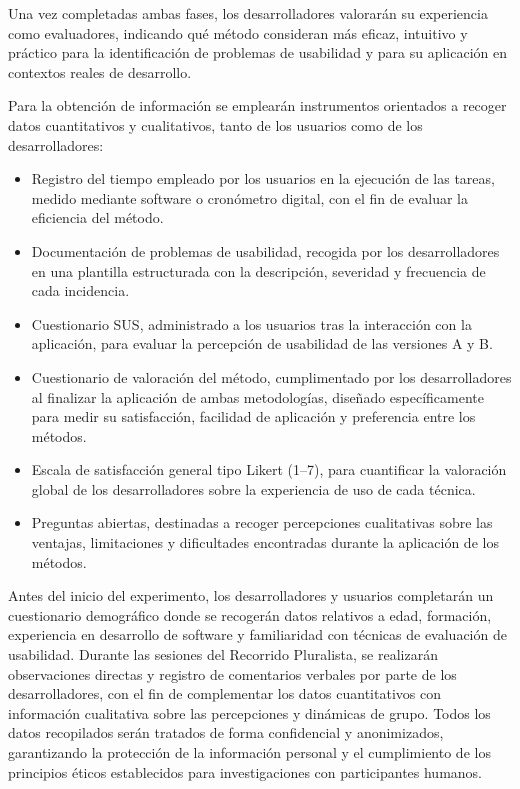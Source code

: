 \documentclass[a4paper,12pt]{report}
\begin{document}
Una vez completadas ambas fases, los desarrolladores valorarán su experiencia como evaluadores, indicando qué método consideran más eficaz, intuitivo y práctico para la identificación de problemas de usabilidad y 
para su aplicación en contextos reales de desarrollo.

Para la obtención de información se emplearán instrumentos orientados a recoger datos cuantitativos y cualitativos, tanto de los usuarios como de los desarrolladores:


\begin{itemize}
    \item Registro del tiempo empleado por los usuarios en la ejecución de las tareas, medido mediante software o cronómetro digital, con el fin de evaluar la eficiencia del método.
    \item Documentación de problemas de usabilidad, recogida por los desarrolladores en una plantilla estructurada con la descripción, severidad y frecuencia de cada incidencia.
    \item Cuestionario SUS, administrado a los usuarios tras la interacción con la aplicación, para evaluar la percepción de usabilidad de las versiones A y B.
    \item Cuestionario de valoración del método, cumplimentado por los desarrolladores al finalizar la aplicación de ambas metodologías, diseñado específicamente para medir su satisfacción, facilidad de aplicación y preferencia entre los métodos.
    \item Escala de satisfacción general tipo Likert (1–7), para cuantificar la valoración global de los desarrolladores sobre la experiencia de uso de cada técnica.
    \item Preguntas abiertas, destinadas a recoger percepciones cualitativas sobre las ventajas, limitaciones y dificultades encontradas durante la aplicación de los métodos.

\end{itemize}



Antes del inicio del experimento, los desarrolladores y usuarios completarán un cuestionario demográfico donde se recogerán datos relativos a edad, formación, experiencia en desarrollo de software y familiaridad con técnicas de evaluación de usabilidad. Durante las sesiones del Recorrido Pluralista, se realizarán observaciones directas y registro de comentarios verbales por parte de los desarrolladores, con el fin de complementar los datos cuantitativos con información cualitativa sobre las percepciones y dinámicas de grupo.
Todos los datos recopilados serán tratados de forma confidencial y anonimizados, garantizando la protección de la información personal y el cumplimiento de los principios éticos establecidos para investigaciones con participantes humanos.
\end{document}
